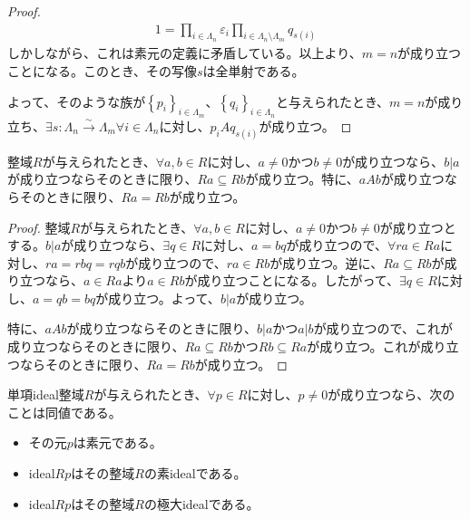 \documentclass[dvipdfmx]{jsarticle}
\begin{document}
\begin{proof}
\begin{align*}
1 = \prod_{i \in \varLambda_{n}} \varepsilon_{i}\prod_{i \in \varLambda_{n} \setminus \varLambda_{m}} q_{s(i)}
\end{align*}
しかしながら、これは素元の定義に矛盾している。以上より、$m = n$が成り立つことになる。このとき、その写像$s$は全単射である。\par
よって、そのような族が$\left\{ p_{i} \right\}_{i \in \varLambda_{m}}$、$\left\{ q_{i} \right\}_{i \in \varLambda_{n}}$と与えられたとき、$m = n$が成り立ち、$\exists s:\varLambda_{n}\overset{\sim}{\rightarrow}\varLambda_{m}\forall i \in \varLambda_{n}$に対し、$p_{i}Aq_{s(i)}$が成り立つ。
\end{proof}
\begin{thm}\label{3.3.4.12}
整域$R$が与えられたとき、$\forall a,b \in R$に対し、$a \neq 0$かつ$b \neq 0$が成り立つなら、$b|a$が成り立つならそのときに限り、$Ra \subseteq Rb$が成り立つ。特に、$aAb$が成り立つならそのときに限り、$Ra = Rb$が成り立つ。
\end{thm}
\begin{proof}
整域$R$が与えられたとき、$\forall a,b \in R$に対し、$a \neq 0$かつ$b \neq 0$が成り立つとする。$b|a$が成り立つなら、$\exists q \in R$に対し、$a = bq$が成り立つので、$\forall ra \in Ra$に対し、$ra = rbq = rqb$が成り立つので、$ra \in Rb$が成り立つ。逆に、$Ra \subseteq Rb$が成り立つなら、$a \in Ra$より$a \in Rb$が成り立つことになる。したがって、$\exists q \in R$に対し、$a = qb = bq$が成り立つ。よって、$b|a$が成り立つ。\par
特に、$aAb$が成り立つならそのときに限り、$b|a$かつ$a|b$が成り立つので、これが成り立つならそのときに限り、$Ra \subseteq Rb$かつ$Rb \subseteq Ra$が成り立つ。これが成り立つならそのときに限り、$Ra = Rb$が成り立つ。
\end{proof}
\begin{thm}\label{3.3.4.13}
単項ideal整域$R$が与えられたとき、$\forall p \in R$に対し、$p \neq 0$が成り立つなら、次のことは同値である。
\begin{itemize}
\item
  その元$p$は素元である。
\item
  ideal$Rp$はその整域$R$の素idealである。
\item
  ideal$Rp$はその整域$R$の極大idealである。
\end{itemize}
\end{thm}
\end{document}

